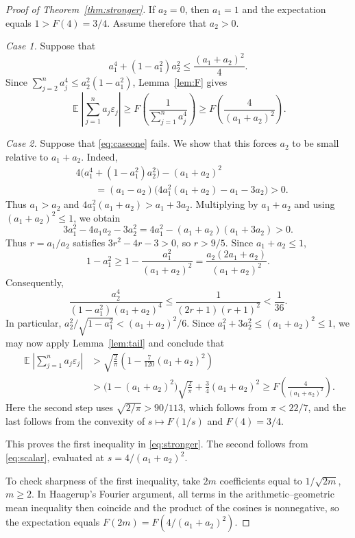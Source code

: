 \documentclass[a4paper,twoside,11pt,reqno]{amsart}
\theoremstyle{definition}
\theoremstyle{remark}
\newcommand{\1}{\mathbbm{1}}
\DeclareMathOperator{\E}{\mathbb{E}}
\begin{document}
\begin{proof}[Proof of Theorem~\ref{thm:stronger}]
If $a_2=0$, then $a_1=1$ and the expectation equals $1>F(4)=3/4$. Assume therefore that $a_2>0$.

\smallskip
\noindent\emph{Case 1.} Suppose that
\begin{equation}\label{eq:caseone}
 a_1^4+(1-a_1^2)a_2^2\le\frac{(a_1+a_2)^2}{4}.
\end{equation}
Since $\sum_{j=2}^n a_j^4\le a_2^2(1-a_1^2)$, Lemma~\ref{lem:F} gives
\[
 \E\left|\sum_{j=1}^n a_j\varepsilon_j\right|
 \ge F\!\left(\frac1{\sum_{j=1}^n a_j^4}\right)
 \ge F\!\left(\frac4{(a_1+a_2)^2}\right).
\]

\smallskip
\noindent\emph{Case 2.} Suppose that \eqref{eq:caseone} fails. We show that this forces $a_2$ to be small relative to $a_1+a_2$. Indeed,
\begin{align*}
 &4\bigl(a_1^4+(1-a_1^2)a_2^2\bigr)-(a_1+a_2)^2\\
 &\qquad=(a_1-a_2)\bigl(4a_1^2(a_1+a_2)-a_1-3a_2\bigr)>0.
\end{align*}
Thus $a_1>a_2$ and $4a_1^2(a_1+a_2)>a_1+3a_2$. Multiplying by $a_1+a_2$ and using $(a_1+a_2)^2\le1$, we obtain
\[
 3a_1^2-4a_1a_2-3a_2^2
 =4a_1^2-(a_1+a_2)(a_1+3a_2)>0.
\]
Thus $r=a_1/a_2$ satisfies $3r^2-4r-3>0$, so $r>9/5$. Since $a_1+a_2\le1$,
\[
 1-a_1^2\ge1-\frac{a_1^2}{(a_1+a_2)^2}
          =\frac{a_2(2a_1+a_2)}{(a_1+a_2)^2}.
\]
Consequently,
\[
 \frac{a_2^4}{(1-a_1^2)(a_1+a_2)^4}
 \le\frac1{(2r+1)(r+1)^2}<\frac1{36}.
\]
In particular, $a_2^2/\sqrt{1-a_1^2}<(a_1+a_2)^2/6$. Since
$a_1^2+3a_2^2\le(a_1+a_2)^2\le1$, we may now apply Lemma~\ref{lem:tail} and conclude that
\begin{align*}
 \E\left|\sum_{j=1}^n a_j\varepsilon_j\right|
 &>\sqrt{\frac2\pi}\left(1-\frac7{120}(a_1+a_2)^2\right)\\
 &>\bigl(1-(a_1+a_2)^2\bigr)\sqrt{\frac2\pi}
   +\frac34(a_1+a_2)^2
 \ge F\!\left(\frac4{(a_1+a_2)^2}\right).
\end{align*}
Here the second step uses $\sqrt{2/\pi}>90/113$, which follows from $\pi<22/7$, and the last follows from the convexity of $s\mapsto F(1/s)$ and $F(4)=3/4$.

This proves the first inequality in \eqref{eq:stronger}. The second follows from \eqref{eq:scalar}, evaluated at $s=4/(a_1+a_2)^2$.

To check sharpness of the first inequality, take $2m$ coefficients equal to $1/\sqrt{2m}$, $m\ge2$. In Haagerup's Fourier argument, all terms in the arithmetic--geometric mean inequality then coincide and the product of the cosines is nonnegative, so the expectation equals $F(2m)=F(4/(a_1+a_2)^2)$.
\end{proof}
\end{document}
